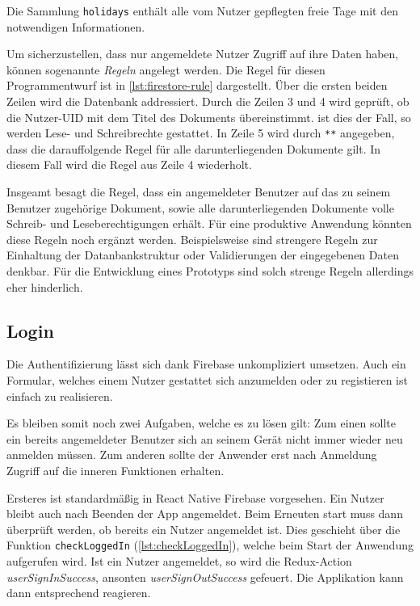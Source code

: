 Die Sammlung \texttt{holidays} enthält alle vom Nutzer gepflegten freie Tage mit den notwendigen Informationen.

Um sicherzustellen, dass nur angemeldete Nutzer Zugriff auf ihre Daten haben,
können sogenannte \textit{Regeln} angelegt werden.
Die Regel für diesen Programmentwurf ist in \autoref{lst:firestore-rule} dargestellt.
Über die ersten beiden Zeilen wird die Datenbank addressiert.
Durch die Zeilen 3 und 4 wird geprüft, ob die Nutzer-UID mit dem Titel des Dokuments übereinstimmt.
ist dies der Fall, so werden Lese- und Schreibrechte gestattet.
In Zeile 5 wird durch \lstinline[language=firestoreRule]{**} angegeben,
dass die darauffolgende Regel für alle darunterliegenden Dokumente gilt.
In diesem Fall wird die Regel aus Zeile 4 wiederholt.




Insgeamt besagt die Regel,
dass ein angemeldeter Benutzer auf das zu seinem Benutzer zugehörige Dokument,
sowie alle darunterliegenden Dokumente volle Schreib- und Leseberechtigungen erhält.
Für eine produktive Anwendung könnten diese Regeln noch ergänzt werden.
Beispielsweise sind strengere Regeln zur Einhaltung der Datanbankstruktur oder Validierungen der eingegebenen Daten denkbar.
Für die Entwicklung eines Prototyps sind solch strenge Regeln allerdings eher hinderlich.


\subsection{Login}
Die Authentifizierung lässt sich dank Firebase unkompliziert umsetzen.
Auch ein Formular, welches einem Nutzer gestattet sich anzumelden oder zu registieren ist einfach zu realisieren.

Es bleiben somit noch zwei Aufgaben, welche es zu lösen gilt:
Zum einen sollte ein bereits angemeldeter Benutzer sich an seinem Gerät nicht immer wieder neu anmelden müssen.
Zum anderen sollte der Anwender erst nach Anmeldung Zugriff auf die inneren Funktionen erhalten.

Ersteres ist standardmäßig in React Native Firebase vorgesehen.
Ein Nutzer bleibt auch nach Beenden der App angemeldet.
Beim Erneuten start muss dann überprüft werden, ob bereits ein Nutzer angemeldet ist.
Dies geschieht über die Funktion \texttt{checkLoggedIn} (\autoref{lst:checkLoggedIn}),
welche beim Start der Anwendung aufgerufen wird.
Ist ein Nutzer angemeldet, so wird die Redux-Action \emph{userSignInSuccess},
ansonten \emph{userSignOutSuccess} gefeuert.
Die Applikation kann dann entsprechend reagieren.

